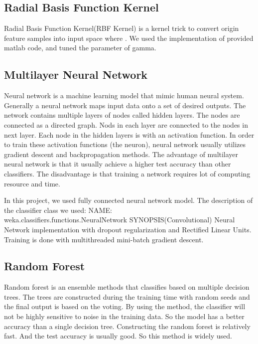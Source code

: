 \documentclass{acm_proc_article-sp}
\begin{document}
\subsection{Radial Basis Function Kernel}
Radial Basis Function Kernel(RBF Kernel)\cite{Perner:2001wu} is a kernel trick to convert origin feature samples into input space where . We used the implementation of provided matlab code, and tuned the parameter of gamma.

\subsection{Multilayer Neural Network}
Neural network \cite{HechtNielsen:1989et} is a machine learning model that mimic human neural system. Generally a neural network maps input data onto a set of desired outputs. The network contains multiple layers of nodes called hidden layers. The nodes are connected as a directed graph. Nods in each layer are connected to the nodes in next layer. Each node in the hidden layers is with an activation function. In order to train these activation functions (the neuron), neural network usually utilizes gradient descent and backpropagation methods.
The advantage of multilayer neural network is that it usually achieve a higher test accuracy than other classifiers. The disadvantage is that training a network requires lot of computing resource and time.

In this project, we used fully connected neural network model.
The description of the classifier class we used:
NAME: \\weka.classifiers.functions.NeuralNetwork
SYNOPSIS(Convolutional) Neural Network implementation with dropout regularization and Rectified Linear Units.
Training is done with multithreaded mini-batch gradient descent.

\subsection{Random Forest}
Random forest \cite{Breiman:2001fb} is an ensemble methods that classifies based on multiple decision trees. The trees are constructed during the training time with random seeds and the final output is based on the voting. By using the method, the classifier will not be highly sensitive to noise in the training data. So the model has a better accuracy than a single decision tree.
Constructing the random forest is relatively fast. And the test accuracy is usually good. So this method is widely used.
\end{document}
